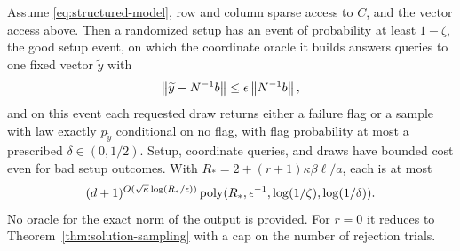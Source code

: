 \begin{theorem}\label{thm:structured-sq}
Assume \eqref{eq:structured-model}, row and column sparse access to $C$,
and the vector access above. Then a randomized setup has an event of
probability at least $1-\zeta$, the good setup event, on which the
coordinate oracle it builds answers queries to one fixed vector
$\widetilde y$ with
\[
 \left\lVert\widetilde y-N^{-1}b\right\rVert\leq\epsilon\left\lVert N^{-1}b\right\rVert,
\]
and on this event each requested draw returns either a failure flag or a
sample with law exactly $p_{\widetilde y}$ conditional on no flag, with
flag probability at most a prescribed $\delta\in(0,1/2)$.
Setup, coordinate queries, and draws have bounded cost even for bad
setup outcomes. With
$R_*=2+(r+1)\kappa\beta\ell/a$, each is at most
\begin{equation}\label{eq:structured-cost}
 (d+1)^{O(\sqrt\kappa\log(R_*/\epsilon))}
 \operatorname{poly}(R_*,\epsilon^{-1},\log(1/\zeta),\log(1/\delta)).
\end{equation}
No oracle for the exact norm of the output is provided. For
$r=0$ it reduces to Theorem~\ref{thm:solution-sampling} with a cap on the
number of rejection trials.
\end{theorem}
